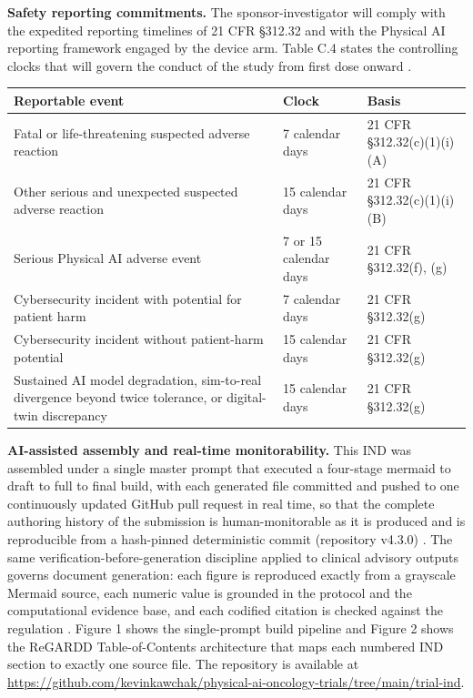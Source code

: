 \noindent\textbf{Safety reporting commitments.} The sponsor-investigator will comply with the expedited reporting timelines of 21 CFR \S 312.32 and with the Physical AI reporting framework engaged by the device arm. Table C.4 states the controlling clocks that will govern the conduct of the study from first dose onward \cite{cfr312paiuni}.

\noindent\begin{tabularx}{\textwidth}{L{6.2cm} L{2.6cm} Y}
\toprule
\textbf{Reportable event} & \textbf{Clock} & \textbf{Basis} \\
\midrule
Fatal or life-threatening suspected adverse reaction & 7 calendar days & 21 CFR \S 312.32(c)(1)(i)(A) \\
Other serious and unexpected suspected adverse reaction & 15 calendar days & 21 CFR \S 312.32(c)(1)(i)(B) \\
Serious Physical AI adverse event & 7 or 15 calendar days & 21 CFR \S 312.32(f), (g) \\
Cybersecurity incident with potential for patient harm & 7 calendar days & 21 CFR \S 312.32(g) \\
Cybersecurity incident without patient-harm potential & 15 calendar days & 21 CFR \S 312.32(g) \\
Sustained AI model degradation, sim-to-real divergence beyond twice tolerance, or digital-twin discrepancy & 15 calendar days & 21 CFR \S 312.32(g) \\
\bottomrule
\end{tabularx}

\noindent\textbf{AI-assisted assembly and real-time monitorability.} This IND was assembled under a single master prompt that executed a four-stage mermaid to draft to full to final build, with each generated file committed and pushed to one continuously updated GitHub pull request in real time, so that the complete authoring history of the submission is human-monitorable as it is produced and is reproducible from a hash-pinned deterministic commit (repository v4.3.0) \cite{oncotrialllm,natlpaiplatf}. The same verification-before-generation discipline applied to clinical advisory outputs governs document generation: each figure is reproduced exactly from a grayscale Mermaid source, each numeric value is grounded in the protocol and the computational evidence base, and each codified citation is checked against the regulation \cite{clintrustpai,llmcomp16fda}. Figure 1 shows the single-prompt build pipeline and Figure 2 shows the ReGARDD Table-of-Contents architecture that maps each numbered IND section to exactly one source file. The repository is available at \url{https://github.com/kevinkawchak/physical-ai-oncology-trials/tree/main/trial-ind}.

